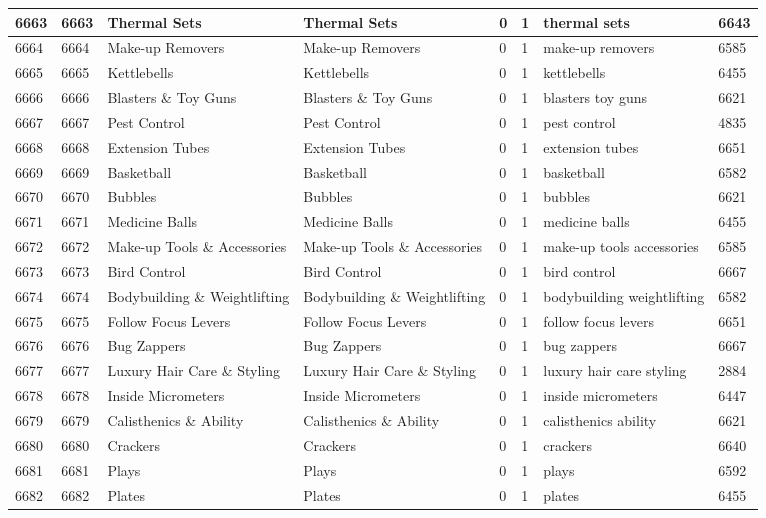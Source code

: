 \begin{longtable}{|l|l|l|l|l|l|l|l|}
6663 & 6663 & Thermal Sets & Thermal Sets & 0 & 1 & thermal sets & 6643 \\ \hline 
6664 & 6664 & Make-up Removers & Make-up Removers & 0 & 1 & make-up removers & 6585 \\ \hline 
6665 & 6665 & Kettlebells & Kettlebells & 0 & 1 & kettlebells & 6455 \\ \hline 
6666 & 6666 & Blasters \& Toy Guns & Blasters \& Toy Guns & 0 & 1 & blasters toy guns & 6621 \\ \hline 
6667 & 6667 & Pest Control & Pest Control & 0 & 1 & pest control & 4835 \\ \hline 
6668 & 6668 & Extension Tubes & Extension Tubes & 0 & 1 & extension tubes & 6651 \\ \hline 
6669 & 6669 & Basketball & Basketball & 0 & 1 & basketball & 6582 \\ \hline 
6670 & 6670 & Bubbles & Bubbles & 0 & 1 & bubbles & 6621 \\ \hline 
6671 & 6671 & Medicine Balls & Medicine Balls & 0 & 1 & medicine balls & 6455 \\ \hline 
6672 & 6672 & Make-up Tools \& Accessories & Make-up Tools \& Accessories & 0 & 1 & make-up tools accessories & 6585 \\ \hline 
6673 & 6673 & Bird Control & Bird Control & 0 & 1 & bird control & 6667 \\ \hline 
6674 & 6674 & Bodybuilding \& Weightlifting & Bodybuilding \& Weightlifting & 0 & 1 & bodybuilding weightlifting & 6582 \\ \hline 
6675 & 6675 & Follow Focus Levers & Follow Focus Levers & 0 & 1 & follow focus levers & 6651 \\ \hline 
6676 & 6676 & Bug Zappers & Bug Zappers & 0 & 1 & bug zappers & 6667 \\ \hline 
6677 & 6677 & Luxury Hair Care \& Styling & Luxury Hair Care \& Styling & 0 & 1 & luxury hair care styling & 2884 \\ \hline 
6678 & 6678 & Inside Micrometers & Inside Micrometers & 0 & 1 & inside micrometers & 6447 \\ \hline 
6679 & 6679 & Calisthenics \& Ability & Calisthenics \& Ability & 0 & 1 & calisthenics ability & 6621 \\ \hline 
6680 & 6680 & Crackers & Crackers & 0 & 1 & crackers & 6640 \\ \hline 
6681 & 6681 & Plays & Plays & 0 & 1 & plays & 6592 \\ \hline 
6682 & 6682 & Plates & Plates & 0 & 1 & plates & 6455 \\ \hline 

\end{longtable}
